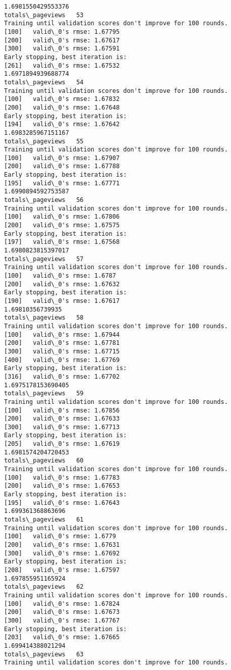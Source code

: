 \documentclass[11pt]{article}
\begin{document}
\begin{Verbatim}[commandchars=\\\{\}]
1.6981550429553376
totals\_pageviews   53
Training until validation scores don't improve for 100 rounds.
[100]	valid\_0's rmse: 1.67795
[200]	valid\_0's rmse: 1.67617
[300]	valid\_0's rmse: 1.67591
Early stopping, best iteration is:
[261]	valid\_0's rmse: 1.67532
1.6971894939688774
totals\_pageviews   54
Training until validation scores don't improve for 100 rounds.
[100]	valid\_0's rmse: 1.67832
[200]	valid\_0's rmse: 1.67648
Early stopping, best iteration is:
[194]	valid\_0's rmse: 1.67642
1.6983285967151167
totals\_pageviews   55
Training until validation scores don't improve for 100 rounds.
[100]	valid\_0's rmse: 1.67907
[200]	valid\_0's rmse: 1.67788
Early stopping, best iteration is:
[195]	valid\_0's rmse: 1.67771
1.6990894592753587
totals\_pageviews   56
Training until validation scores don't improve for 100 rounds.
[100]	valid\_0's rmse: 1.67806
[200]	valid\_0's rmse: 1.67575
Early stopping, best iteration is:
[197]	valid\_0's rmse: 1.67568
1.6980823815397017
totals\_pageviews   57
Training until validation scores don't improve for 100 rounds.
[100]	valid\_0's rmse: 1.6787
[200]	valid\_0's rmse: 1.67632
Early stopping, best iteration is:
[190]	valid\_0's rmse: 1.67617
1.69810356739935
totals\_pageviews   58
Training until validation scores don't improve for 100 rounds.
[100]	valid\_0's rmse: 1.67944
[200]	valid\_0's rmse: 1.67781
[300]	valid\_0's rmse: 1.67715
[400]	valid\_0's rmse: 1.67769
Early stopping, best iteration is:
[316]	valid\_0's rmse: 1.67702
1.6975178153690405
totals\_pageviews   59
Training until validation scores don't improve for 100 rounds.
[100]	valid\_0's rmse: 1.67856
[200]	valid\_0's rmse: 1.67633
[300]	valid\_0's rmse: 1.67713
Early stopping, best iteration is:
[205]	valid\_0's rmse: 1.67619
1.6981574204720453
totals\_pageviews   60
Training until validation scores don't improve for 100 rounds.
[100]	valid\_0's rmse: 1.67783
[200]	valid\_0's rmse: 1.67653
Early stopping, best iteration is:
[195]	valid\_0's rmse: 1.67643
1.699361368863696
totals\_pageviews   61
Training until validation scores don't improve for 100 rounds.
[100]	valid\_0's rmse: 1.6779
[200]	valid\_0's rmse: 1.67631
[300]	valid\_0's rmse: 1.67692
Early stopping, best iteration is:
[208]	valid\_0's rmse: 1.67597
1.697855951165924
totals\_pageviews   62
Training until validation scores don't improve for 100 rounds.
[100]	valid\_0's rmse: 1.67824
[200]	valid\_0's rmse: 1.67673
[300]	valid\_0's rmse: 1.67767
Early stopping, best iteration is:
[203]	valid\_0's rmse: 1.67665
1.699414388021294
totals\_pageviews   63
Training until validation scores don't improve for 100 rounds.

\end{Verbatim}
\end{document}
